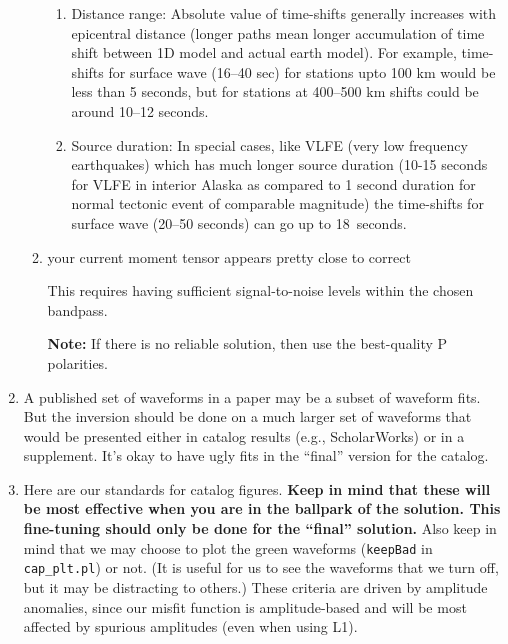 \begin{enumerate}
\begin{enumerate}
\begin{enumerate}
\item Distance range: Absolute value of time-shifts generally increases with epicentral distance (longer paths mean longer accumulation of time shift between 1D model and actual earth model). For example, time-shifts for surface wave (16--40 sec) for stations upto 100 km would be less than 5 seconds, but for stations at 400--500 km shifts could be around 10--12 seconds.

\item Source duration: In special cases, like VLFE (very low frequency earthquakes) which has much longer source duration (10-15 seconds for  VLFE in interior Alaska as compared to 1 second duration for normal tectonic event of comparable magnitude) the time-shifts for surface wave (20--50 seconds) can go up to 18~seconds.
\end{enumerate}

\label{item:tshift}

\item your current moment tensor appears pretty close to correct

This requires having sufficient signal-to-noise levels within the chosen bandpass.

{\bf Note:} If there is no reliable solution, then use the best-quality P polarities.

\end{enumerate}

\item A published set of waveforms in a paper may be a subset of waveform fits. But the inversion should be done on a much larger set of waveforms that would be presented either in catalog results (e.g., ScholarWorks) or in a supplement. It's okay to have ugly fits in the ``final'' version for the catalog.


\item Here are our standards for catalog figures. {\bf Keep in mind that these will be most effective when you are in the ballpark of the solution. This fine-tuning should only be done for the ``final'' solution.} Also keep in mind that we may choose to plot the green waveforms (\verb+keepBad+ in \verb+cap_plt.pl+) or not. (It is useful for us to see the waveforms that we turn off, but it may be distracting to others.) These criteria are driven by amplitude anomalies, since our misfit function is amplitude-based and will be most affected by spurious amplitudes (even when using L1).


\end{enumerate}
